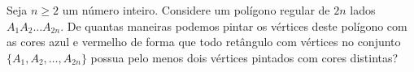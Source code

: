 Seja $n \ge 2$ um número inteiro. Considere um polígono regular de $2n$ lados $A_1 A_2 \dots A_{2n}$. De quantas maneiras podemos pintar os vértices deste polígono com as cores azul e vermelho de forma que todo retângulo com vértices no conjunto $\{A_1, A_2, \dots, A_{2n}\}$ possua pelo menos dois vértices pintados com cores distintas?
